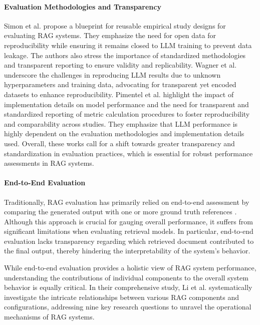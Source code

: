 \paragraph{Evaluation Methodologies and Transparency}
Simon et al.\cite{Simon.10112024} propose a blueprint for reusable empirical study designs for evaluating RAG systems. They emphasize the need for open data for reproducibility while ensuring it remains closed to LLM training to prevent data leakage. The authors also stress the importance of standardized methodologies and transparent reporting to ensure validity and replicability. Wagner et al.\cite{Wagner.12.11.2024} underscore the challenges in reproducing LLM results due to unknown hyperparameters and training data, advocating for transparent yet encoded datasets to enhance reproducibility. Pimentel et al.\cite{M.A.Pimentel.2024} highlight the impact of implementation details on model performance and the need for transparent and standardized reporting of metric calculation procedures to foster reproducibility and comparability across studies. They emphasize that LLM performance is highly dependent on the evaluation methodologies and implementation details used. Overall, these works call for a shift towards greater transparency and standardization in evaluation practices, which is essential for robust performance assessments in RAG systems.

\paragraph{End-to-End Evaluation}

Traditionally, RAG evaluation has primarily relied on end-to-end assessment by comparing the generated output with one or more ground truth references \cite{Salemi.2024}. Although this approach is crucial for gauging overall performance, it suffers from significant limitations when evaluating retrieval models. In particular, end-to-end evaluation lacks transparency regarding which retrieved document contributed to the final output, thereby hindering the interpretability of the system's behavior. 

While end-to-end evaluation provides a holistic view of RAG system performance, understanding the contributions of individual components to the overall system behavior is equally critical. In their comprehensive study, Li et al. \cite{Li.13.01.2025} systematically investigate the intricate relationships between various RAG components and configurations, addressing nine key research questions to unravel the operational mechanisms of RAG systems.

